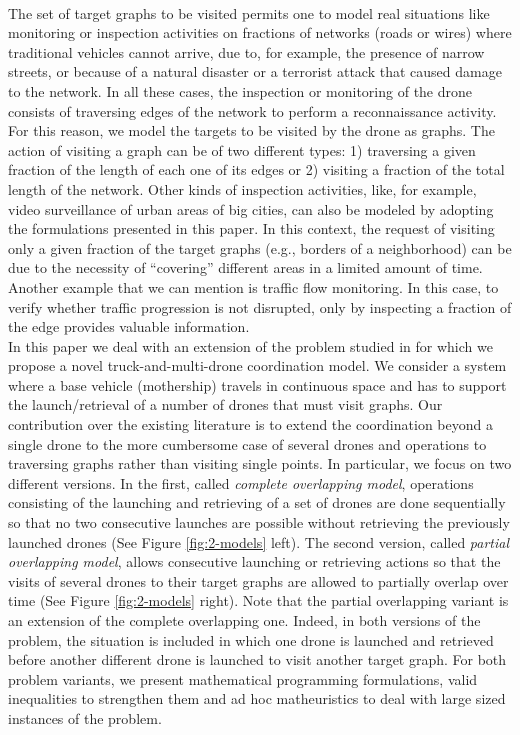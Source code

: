 \documentclass[10pt,a4paper]{elsarticle}
\newcommand{\EN}[1]{{\color{black}#1}}
\begin{document}
\\
The set of target graphs to be visited permits \EN{one} to model real situations like monitoring \EN{or} inspection activities on fractions of networks (roads or wires) where traditional vehicles cannot arrive, due to, for example, the presence of narrow streets, or because of a natural disaster or a terrorist attack that caused damage \EN{to} the network. In all these cases, the inspection or monitoring of the drone consists \EN{of} traversing edges of the network to perform a reconnaissance activity. For this reason, we model the targets to be visited by the drone as graphs. The action of visiting a graph can be of two different types: 1) traversing a given fraction of the length of each one of its edges or 2) visiting a fraction of the total length of the network. Other kinds of inspection activities, like, for example, video surveillance of urban areas of big cities, can \EN{also be modeled} by adopting the formulations presented in this paper. In this context, the request of visiting only a given fraction of the target graphs (e.g., borders of a neighborhood) can be due to the necessity of ``covering” different areas in a limited amount of time. Another example that we can mention is traffic flow monitoring. In this case, to verify \EN{whether} traffic progression is not disrupted, only \EN{by} inspecting a fraction of the edge provides valuable information.
\\
In this paper we deal with an extension of the problem studied in \cite{art:Amorosi2021} for which we propose a novel truck-and-multi-drone coordination model. We consider a system where a base vehicle (mothership) travels in continuous space and has to support the launch/retriev\EN{al} of a number of drones that must visit graphs. Our contribution over the existing literature is to extend the coordination beyond a single drone to the more cumbersome case of several drones and operations to traversing graphs rather than visiting single points. 
\noindent
In particular, we focus on two different versions. In the first, called \textit{complete overlapping model}, operations consisting o\EN{f} the launching and retrieving of a set of drones are done sequentially so that no two consecutive launch\EN{es} are  possible without retrieving the previously launched drones (See Figure \ref{fig:2-models} left).  The second version, called \textit{partial overlapping model}, allows consecutive launching or retrieving actions so that the visits of several drones to their target graphs are allowed to partially overlap over time (See Figure \ref{fig:2-models} right). 
Note that the partial overlapping variant is an extension of the complete overlapping one. Indeed, in both versions of the problem, the situation \EN{is included} in which one drone is launched and retrieved before another different drone is launched to visit another target graph.
For both problem variants, we present  mathematical programming formulations, valid inequalities to strengthen them and ad hoc matheuristics to deal with large sized instances of the problem.\\
\noindent
\end{document}
